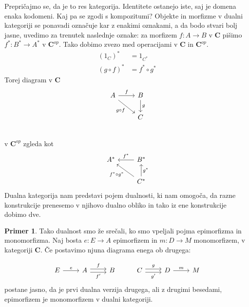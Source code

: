 \documentclass[12pt,a4paper]{book}
\theoremstyle{definition}
\theoremstyle{plain}
\theoremstyle{definition}
\newtheorem*{primer*}{Primer}
\theoremstyle{remark}
\newcommand{\cat}[1]{\textbf{#1}}
\begin{document}
Prepričajmo se, da je to res kategorija. Identitete ostanejo iste, saj je domena enaka kodomeni. Kaj pa se zgodi s kompozitumi? Objekte in morfizme v dualni kategoriji se ponavadi označuje kar z enakimi oznakami, a da bodo stvari bolj jasne, uvedimo za trenutek naslednje oznake: za morfizem $f : A \to B$ v $\cat{C}$ pišimo $f^* : B^* \to A^*$ v $\cat{C}^{op}$. Tako dobimo zvezo med operacijami v $\cat{C}$ in $\cat{C}^{op}$.
\begin{align*}
(1_C)^* &= 1_{C^*} \\
(g \circ f)^* &= f^* \circ g^*
\end{align*}
Torej diagram v $\cat{C}$
\[ \begin{tikzcd}
A \arrow[r, "f"] \arrow[rd, "g \circ f"'] & B \arrow[d, "g"] \\
&	C \\
\end{tikzcd} \]
%
v $\cat{C}^{op}$ zgleda kot
%
\[ \begin{tikzcd}
A^* & \arrow[l, "f^*"'] B^* \\
& \arrow[lu, "f^* \circ g^*"] C^* \arrow[u, "g^*"']
\end{tikzcd} \]
%
Dualna kategorija nam predstavi pojem dualnosti, ki nam omogoča, da razne konstrukcije prenesemo v njihovo dualno obliko in tako iz ene konstrukcije dobimo dve.

\begin{primer*}
Tako dualnost smo že srečali, ko smo vpeljali pojma epimorfizma in monomorfizma. Naj bosta $e : E \to A$ epimorfizem in $m : D \to M$ monomorfizem, v kategoriji $\cat{C}$. Če postavimo njuna diagrama enega ob drugega:

\[ \begin{tikzcd}
E \ar[r, "e"] & A \ar[r, shift left, "f"] \ar[r, shift right, "f'"'] & B & C \ar[r, shift left, "g"] \ar[r, shift right, "g'"'] & D \ar[r, "m"] & M
\end{tikzcd} \]
postane jasno, da je prvi dualna verzija drugega, ali z drugimi besedami, epimorfizem je monomorfizem v dualni kategoriji.
\end{primer*}
\end{document}
